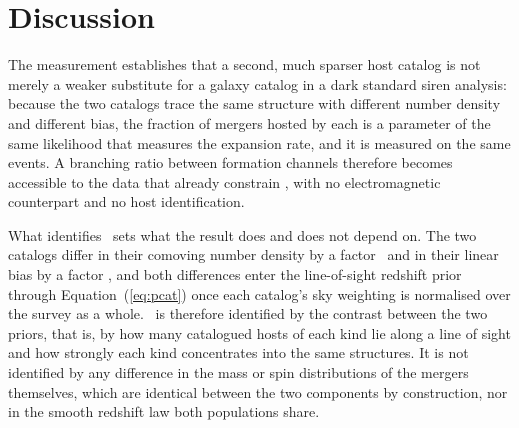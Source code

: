 \section{Discussion}
\label{sec:discussion}

The measurement establishes that a second, much sparser host catalog is not
merely a weaker substitute for a galaxy catalog in a dark standard siren
analysis: because the two catalogs trace the same structure with different
number density and different bias, the fraction of mergers hosted by each is a
parameter of the same likelihood that measures the expansion rate, and it is
measured on the same events. A branching ratio between formation channels
\citep{FordMcKernan2022} therefore becomes accessible to the data that already
constrain \Hz, with no electromagnetic counterpart and no host identification.

What identifies \fagn\ sets what the result does and does not depend on. The
two catalogs differ in
their comoving number density by a factor \DensityRatio\ and in their linear
bias by a factor \BiasRatioMeas, and both differences enter the line-of-sight
redshift prior through Equation~(\ref{eq:pcat}) once each catalog's sky
weighting is normalised over the survey as a whole. \fagn\ is therefore
identified by the contrast between the two priors, that is, by how many
catalogued hosts of each kind lie along a line of sight and how strongly each
kind concentrates into the same structures. It is not identified by any
difference in the mass or spin distributions of the mergers themselves, which
are identical between the two components by construction, nor in the smooth
redshift law both populations share.

